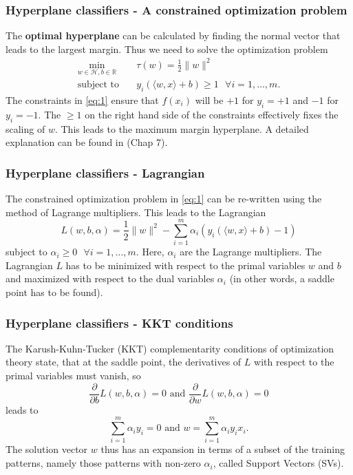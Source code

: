 \documentclass{beamer}
\begin{document}
\begin{frame}{}
    \frametitle{Hyperplane classifiers - A constrained optimization problem}
    The \textbf{optimal hyperplane} can be calculated by finding the normal vector that leads to the largest margin. Thus we need to solve the optimization problem
    \begin{equation} \label{eq:1}
        \begin{aligned}
            \min_{w \in \mathcal{H}, b \in \mathbb{R}} \quad & \tau (w) = \frac{1}{2} \lVert w \rVert^2 \\
            \textrm{subject to} \quad & y_{i} \left( \langle w,x \rangle + b \right) \geq 1 \text{ } \forall i = {1, \dots, m}. 
        \end{aligned}
    \end{equation}
    The constraints in \eqref{eq:1} ensure that $f(x_i)$ will be $+1$ for $y_i = +1$ and $-1$ for  $y_i = -1$. The $\geq 1$ on the right hand side of the constraints effectively fixes the scaling of $w$. This leads to the maximum margin hyperplane. A detailed explanation can be found in \cite{Schoelkopf}(Chap 7).
\end{frame}


\begin{frame}{}
    \frametitle{Hyperplane classifiers - Lagrangian}
    The constrained optimization problem in \eqref{eq:1} can be re-written using the method of Lagrange multipliers. This leads to the Lagrangian
    \begin{equation} \label{eq:2}
        L(w,b,\alpha) = \frac{1}{2} \lVert w \rVert^2 - \sum_{i=1}^{m} \alpha_i \left( y_{i} \left( \langle w,x \rangle + b \right) - 1 \right)
    \end{equation}
    subject to $\alpha_i \geq 0 \text{ } \forall i = {1, \dots, m}$. Here, $\alpha_i$ are the Lagrange multipliers. The Lagrangian $L$ has to be minimized with respect to the primal variables $w$ and $b$ and maximized with respect to the dual variables $\alpha_i$ (in other words, a saddle point has to be found).
\end{frame}


\begin{frame}{}
    \frametitle{Hyperplane classifiers - KKT conditions}
    The Karush-Kuhn-Tucker (KKT) complementarity conditions of optimization theory state, that at the saddle point, the derivatives of $L$ with respect to the
    primal variables must vanish, so
    \begin{equation}
        \frac{\partial}{\partial b} L(w,b,\alpha) = 0 \text{ and } \frac{\partial}{\partial w} L(w,b,\alpha) = 0
    \end{equation}
    leads to
    \begin{equation} \label{eq:3}
        \sum_{i=1}^{m} \alpha_i y_i = 0 \text{ and } w = \sum_{i=1}^{m} \alpha_i y_i x_i.
    \end{equation}
    The solution vector $w$ thus has an expansion in terms of a subset of the training patterns, namely those patterns with non-zero $\alpha_i$, called Support Vectors (SVs).
\end{frame}
\end{document}
